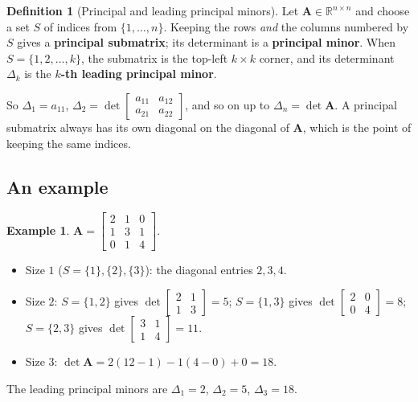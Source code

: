\documentclass[11pt]{article}
\theoremstyle{plain}
\theoremstyle{definition}
\newtheorem{defn}{Definition}[section]
\newtheorem{ex}{Example}[section]
\theoremstyle{remark}
\newcommand{\R}{\mathbb{R}}
\newcommand{\mt}[1]{\mathbf{#1}}
\begin{document}
\begin{defn}[Principal and leading principal minors]
Let $\mt{A}\in\R^{n\times n}$ and choose a set $S$ of indices from
$\{1,\dots,n\}$. Keeping the rows \emph{and} the columns numbered by $S$ gives a
\textbf{principal submatrix}; its determinant is a \textbf{principal minor}.
When $S=\{1,2,\dots,k\}$, the submatrix is the top-left $k\times k$ corner, and
its determinant $\Delta_k$ is the \textbf{$k$-th leading principal minor}.
\end{defn}

\noindent So $\Delta_1=a_{11}$, $\Delta_2=\det\begin{bmatrix}a_{11}&a_{12}\\a_{21}&a_{22}\end{bmatrix}$,
and so on up to $\Delta_n=\det\mt{A}$. A principal submatrix always has its own
diagonal on the diagonal of $\mt{A}$, which is the point of keeping the same
indices.

\subsection{An example}
\begin{ex}
\label{ex:principal}
$\mt{A}=\begin{bmatrix}2&1&0\\1&3&1\\0&1&4\end{bmatrix}$.
\begin{itemize}[leftmargin=1.4em,itemsep=3pt]
  \item Size $1$ ($S=\{1\},\{2\},\{3\}$): the diagonal entries $2,3,4$.
  \item Size $2$: $S=\{1,2\}$ gives $\det\begin{bmatrix}2&1\\1&3\end{bmatrix}=5$;
        $S=\{1,3\}$ gives $\det\begin{bmatrix}2&0\\0&4\end{bmatrix}=8$;
        $S=\{2,3\}$ gives $\det\begin{bmatrix}3&1\\1&4\end{bmatrix}=11$.
  \item Size $3$: $\det\mt{A}=2(12-1)-1(4-0)+0=18$.
\end{itemize}
The leading principal minors are $\Delta_1=2$, $\Delta_2=5$, $\Delta_3=18$.
\end{ex}
\end{document}
